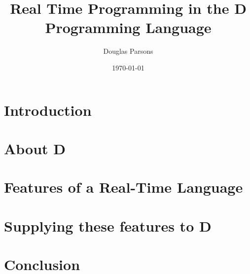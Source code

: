 \documentclass[a4paper, 11pt]{article}
\title{Real Time Programming in the D Programming Language}
\author{Douglas Parsons}
\date{\today}
\begin{document}
\maketitle
%
\section{Introduction}

\section{About D}

\section{Features of a Real-Time Language}

\section{Supplying these features to D}

\section{Conclusion}

%
%
%
\end{document}
